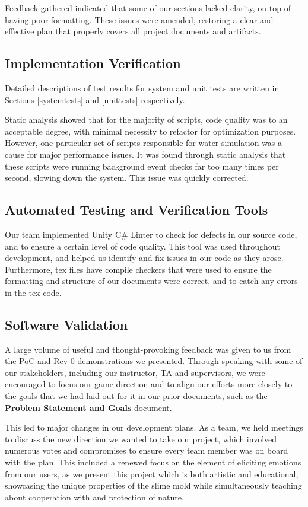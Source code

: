 \documentclass[12pt, titlepage]{article}
\begin{document}
Feedback gathered indicated that some of our sections lacked clarity, on top of
having poor formatting. These issues were amended, restoring a clear and
effective plan that properly covers all project documents and artifacts.

\subsection{Implementation Verification}
Detailed descriptions of test results for system and unit tests are written in
Sections \ref{systemtests} and \ref{unittests} respectively.

Static analysis showed that for the majority of scripts, code quality was to
an acceptable degree, with minimal necessity to refactor for optimization purposes.
However, one particular set of scripts responsible for water simulation was a cause
for major performance issues. It was found through static analysis that these scripts
were running background event checks far too many times per second, slowing down the
system. This issue was quickly corrected.

\subsection{Automated Testing and Verification Tools}
Our team implemented Unity C\# Linter to check for defects in our source code, and to ensure a certain level of code quality. This tool was used throughout development, and helped us identify and fix issues in our code as they arose. Furthermore, tex files have compile checkers that were used to ensure the formatting and structure of our documents were correct, and to catch any errors in the tex code.

\subsection{Software Validation}
A large volume of useful and thought-provoking feedback was given to us
from the PoC and Rev 0 demonstrations we presented. Through speaking with some of
our stakeholders, including our instructor, TA and supervisors, we were encouraged to focus our game direction and to align our efforts more closely to the goals that we had laid out for it in our prior documents, such as the
\href{https://github.com/felix-hurst/Ad-Natura/blob/main/docs/ProblemStatementAndGoals/ProblemStatement.pdf}{\bf{Problem Statement and Goals}} document.

This led to major changes in our development plans. As a team, we held
meetings to discuss the new direction we wanted to take our project,
which involved numerous votes and compromises to ensure every team member
was on board with the plan. This included a renewed focus on the element of
eliciting emotions from our users, as we present this project which is both
artistic and educational, showcasing the unique properties of the slime mold
while simultaneously teaching about cooperation with and protection of nature.
\end{document}
